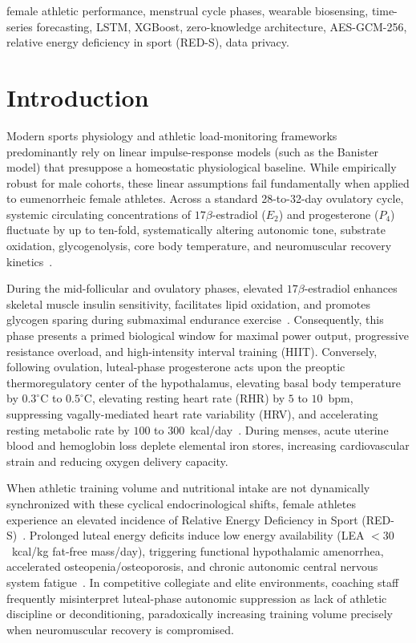 \documentclass[conference]{IEEEtran}
\begin{document}
\begin{IEEEkeywords}
female athletic performance, menstrual cycle phases, wearable biosensing, time-series forecasting, LSTM, XGBoost, zero-knowledge architecture, AES-GCM-256, relative energy deficiency in sport (RED-S), data privacy.
\end{IEEEkeywords}

\section{Introduction}
Modern sports physiology and athletic load-monitoring frameworks predominantly rely on linear impulse-response models (such as the Banister model) that presuppose a homeostatic physiological baseline. While empirically robust for male cohorts, these linear assumptions fail fundamentally when applied to eumenorrheic female athletes. Across a standard 28-to-32-day ovulatory cycle, systemic circulating concentrations of $17\beta$-estradiol ($E_2$) and progesterone ($P_4$) fluctuate by up to ten-fold, systematically altering autonomic tone, substrate oxidation, glycogenolysis, core body temperature, and neuromuscular recovery kinetics~\cite{bruinvels2022}.

During the mid-follicular and ovulatory phases, elevated $17\beta$-estradiol enhances skeletal muscle insulin sensitivity, facilitates lipid oxidation, and promotes glycogen sparing during submaximal endurance exercise~\cite{sims2021}. Consequently, this phase presents a primed biological window for maximal power output, progressive resistance overload, and high-intensity interval training (HIIT). Conversely, following ovulation, luteal-phase progesterone acts upon the preoptic thermoregulatory center of the hypothalamus, elevating basal body temperature by $0.3^\circ$C to $0.5^\circ$C, elevating resting heart rate (RHR) by $5$ to $10$~bpm, suppressing vagally-mediated heart rate variability (HRV), and accelerating resting metabolic rate by $100$ to $300$~kcal/day~\cite{barr1995}. During menses, acute uterine blood and hemoglobin loss deplete elemental iron stores, increasing cardiovascular strain and reducing oxygen delivery capacity.

When athletic training volume and nutritional intake are not dynamically synchronized with these cyclical endocrinological shifts, female athletes experience an elevated incidence of Relative Energy Deficiency in Sport (RED-S)~\cite{mountjoy2018}. Prolonged luteal energy deficits induce low energy availability (LEA $< 30$~kcal/kg fat-free mass/day), triggering functional hypothalamic amenorrhea, accelerated osteopenia/osteoporosis, and chronic autonomic central nervous system fatigue~\cite{mountjoy2018}. In competitive collegiate and elite environments, coaching staff frequently misinterpret luteal-phase autonomic suppression as lack of athletic discipline or deconditioning, paradoxically increasing training volume precisely when neuromuscular recovery is compromised.
\end{document}
